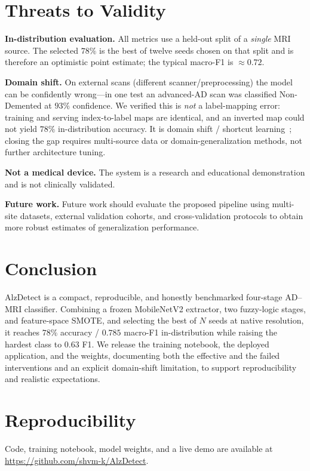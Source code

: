 \documentclass[journal]{IEEEtran}
\begin{document}
\section{Threats to Validity}
\textbf{In-distribution evaluation.} All metrics use a held-out split of a
\emph{single} MRI source. The selected $78\%$ is the best of twelve seeds chosen
on that split and is therefore an optimistic point estimate; the typical macro-F1
is $\approx0.72$.

\textbf{Domain shift.} On external scans (different scanner/preprocessing) the
model can be confidently wrong---in one test an advanced-AD scan was classified
Non-Demented at $93\%$ confidence. We verified this is \emph{not} a label-mapping
error: training and serving index-to-label maps are identical, and an inverted
map could not yield $78\%$ in-distribution accuracy. It is domain shift /
shortcut learning~\cite{shortcut}; closing the gap requires multi-source data or
domain-generalization methods, not further architecture tuning.

\textbf{Not a medical device.} The system is a research and educational demonstration and is not clinically validated.

\textbf{Future work.}
Future work should evaluate the proposed pipeline using multi-site datasets,
external validation cohorts, and cross-validation protocols to obtain more
robust estimates of generalization performance.

\section{Conclusion}
AlzDetect is a compact, reproducible, and honestly benchmarked four-stage AD--MRI
classifier. Combining a frozen MobileNetV2 extractor, two fuzzy-logic stages, and
feature-space SMOTE, and selecting the best of $N$ seeds at native resolution, it
reaches $78\%$ accuracy / $0.785$ macro-F1 in-distribution while raising the
hardest class to $0.63$ F1. We release the training notebook, the deployed
application, and the weights, documenting both the effective and the failed
interventions and an explicit domain-shift limitation, to support reproducibility
and realistic expectations.

\section*{Reproducibility}
Code, training notebook, model weights, and a live demo are available at
\url{https://github.com/shvm-k/AlzDetect}.
\end{document}
